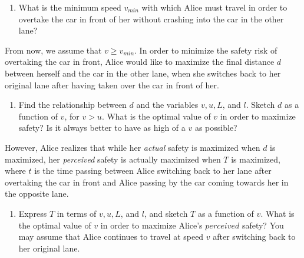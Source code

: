 \documentclass{article}
\begin{document}
\begin{enumerate}[label=\alph*.]
\item What is the minimum speed $v_{min}$ with which Alice must travel in order to overtake the car in front of her without crashing into the car in the other lane?
\end{enumerate}

From now, we assume that $v \ge v_{min}$. In order to minimize the safety risk of overtaking the car in front, Alice would like to maximize the final distance $d$ between herself and the car in the other lane, when she switches back to her original lane after having taken over the car in front of her.

\begin{enumerate}[label=\alph*., resume]
\item Find the relationship between $d$ and the variables $v, u, L$, and $l$. Sketch $d$ as a function of $v$, for $v > u$. What is the optimal value of $v$ in order to maximize safety? Is it always better to have as high of a $v$ as possible?
\end{enumerate}

However, Alice realizes that while her \textit{actual} safety is maximized when $d$ is maximized, her \textit{perceived} safety is actually maximized when $T$ is maximized, where $t$ is the time passing between Alice switching back to her lane after overtaking the car in front and Alice passing by the car coming towards her in the opposite lane.  

\begin{enumerate}[label=\alph*., resume]
    \item Express $T$ in terms of $v, u, L$, and $l$, and sketch $T$ as a function of $v$. What is the optimal value of $v$ in order to maximize Alice's $perceived$ safety? You may assume that Alice continues to travel at speed $v$ after switching back to her original lane.
\end{enumerate}
\end{document}

